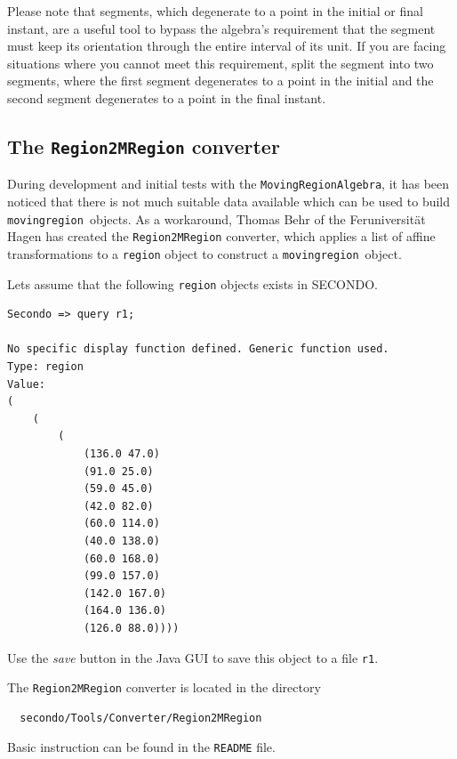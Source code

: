 \documentclass[a4paper,12pt]{article}
\newcommand{\secondo}{{\scshape SE\-CON\-DO}}
\newcommand{\mra}{{\tt Moving\-Region\-Algebra}}
\newcommand{\mr}{{\tt movingregion}}
\begin{document}
Please note that segments, which degenerate to a point in the initial or
final instant, are a useful tool to bypass the algebra's requirement that
the segment must keep its orientation through the entire interval of its
unit. If you are facing situations where you cannot meet this requirement,
split the segment into two segments, where the first segment degenerates to
a point in the initial and the second segment degenerates to a point in the
final instant.

\subsection{The {\tt Region2MRegion} converter}

During development and initial tests with the \mra, it has been noticed
that there is not much suitable data available which can be used to build
\mr\ objects. As a workaround, Thomas Behr of the Feruniversit\"{a}t Hagen
has created the
{\tt Region2MRegion} converter, which applies a list of affine
transformations to a {\tt region} object to construct a \mr\ object.

Lets assume that the following {\tt region} objects exists in \secondo.
\begin{verbatim}
Secondo => query r1;

No specific display function defined. Generic function used.
Type: region
Value: 
(
    (
        (
            (136.0 47.0) 
            (91.0 25.0) 
            (59.0 45.0) 
            (42.0 82.0) 
            (60.0 114.0) 
            (40.0 138.0) 
            (60.0 168.0) 
            (99.0 157.0) 
            (142.0 167.0) 
            (164.0 136.0) 
            (126.0 88.0))))
\end{verbatim}
Use the {\em save} button in the Java GUI to save this object to a file
{\tt r1}.

The {\tt Region2MRegion} converter is located in the directory
\begin{verbatim}
  secondo/Tools/Converter/Region2MRegion
\end{verbatim}
Basic instruction can be found in the {\tt README} file.
\end{document}

